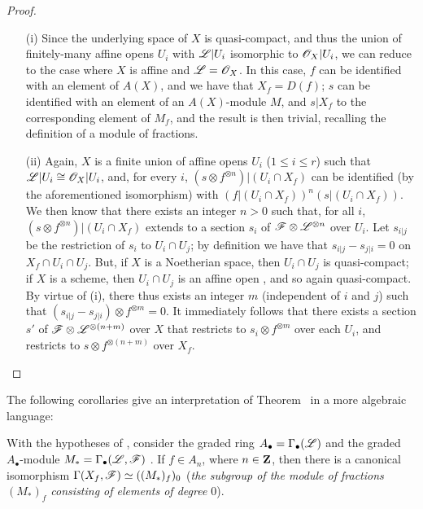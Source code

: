 \begin{proof}
\medskip\noindent
\begin{enumerate}
  \item[(i)] Since the underlying space of $X$ is quasi-compact, and thus the union of
    finitely-many affine opens $U_i$ with $\mathscr{L}|U_i$ isomorphic to
    $\mathscr{O}_X|U_i$, we can reduce to the case where $X$ is affine and $\mathscr{L}=\mathscr{O}_X$.
    In this case, $f$ can be identified with an element of $A(X)$, and we have that
    $X_f=D(f)$; $s$ can be identified with an element of an $A(X)$-module $M$, and
    $s|X_f$ to the corresponding element of $M_f$, and the result is then trivial,
    recalling the definition of a module of fractions.
  \item[(ii)] Again, $X$ is a finite union of affine opens $U_i$ ($1\leq i\leq r$)
    such that $\mathscr{L}|U_i\cong\mathscr{O}_X|U_i$, and, for every $i$,
    $(s\otimes f^{\otimes n})|(U_i\cap X_f)$ can be identified (by the aforementioned
    isomorphism) with $(f|(U_i\cap X_f))^n(s|(U_i\cap X_f))$. We then know
     that there exists an integer $n>0$ such that, for all
    $i$, $(s\otimes f^{\otimes n})|(U_i\cap X_f)$ extends to a section $s_i$ of
    $\mathscr{F}\otimes\mathscr{L}^{\otimes n}$ over $U_i$. Let $s_{i|j}$ be the restriction
    of $s_i$ to $U_i\cap U_j$; by definition we have that $s_{i|j}-s_{j|i}=0$ on
    $X_f\cap U_i\cap U_j$. But, if $X$ is a Noetherian space, then $U_i\cap U_j$ is
    quasi-compact; if $X$ is a scheme, then $U_i\cap U_j$ is an affine open
    , and so again quasi-compact. By virtue of (i), there thus
    exists an integer $m$ (independent of $i$ and $j$) such that
    $(s_{i|j}-s_{j|i})\otimes f^{\otimes m}=0$. It immediately follows that there
    exists a section $s'$ of $\mathscr{F}\otimes\mathscr{L}^{\otimes(n+m)}$ over $X$ that
    restricts to $s_i\otimes f^{\otimes m}$ over each $U_i$, and restricts to
    $s\otimes f^{\otimes(n+m)}$ over $X_f$.
\end{enumerate}
\end{proof}

The following corollaries give an interpretation of Theorem~ in a more
algebraic language:
\begin{corollary}[9.3.2]
\label{I.9.3.2}
With the hypotheses of , consider the graded ring $A_\bullet=\Gamma_\bullet(\mathscr{L})$
and the graded $A_\bullet$-module $M_*=\Gamma_\bullet(\mathscr{L},\mathscr{F})$ . If $f\in A_n$,
where $n\in\mathbf{Z}$, then there is a canonical isomorphism
$\Gamma(X_f,\mathscr{F})\simeq((M_*)_f)_0$ (\emph{the subgroup of the module of
fractions $(M_*)_f$ consisting of elements of degree $0$}).
\end{corollary}

